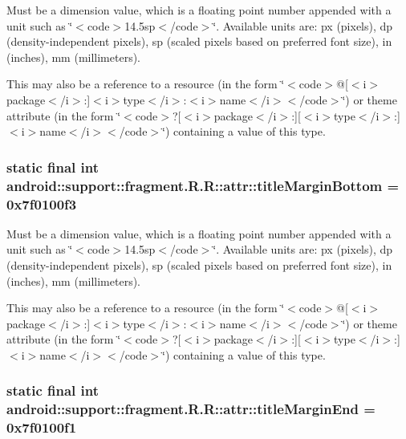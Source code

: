 Must be a dimension value, which is a floating point number appended with a unit such as \char`\"{}$<$code$>$14.5sp$<$/code$>$\char`\"{}. Available units are: px (pixels), dp (density-independent pixels), sp (scaled pixels based on preferred font size), in (inches), mm (millimeters). 

This may also be a reference to a resource (in the form \char`\"{}$<$code$>$@\mbox{[}$<$i$>$package$<$/i$>$:\mbox{]}$<$i$>$type$<$/i$>$:$<$i$>$name$<$/i$>$$<$/code$>$\char`\"{}) or theme attribute (in the form \char`\"{}$<$code$>$?\mbox{[}$<$i$>$package$<$/i$>$:\mbox{]}\mbox{[}$<$i$>$type$<$/i$>$:\mbox{]}$<$i$>$name$<$/i$>$$<$/code$>$\char`\"{}) containing a value of this type. \hypertarget{classandroid_1_1support_1_1fragment_1_1_r_1_1attr_c45d5d0d89c9c99926a853e620fb1501}{
\subsubsection[{titleMarginBottom}]{\setlength{\rightskip}{0pt plus 5cm}static final int android::support::fragment.R.R::attr::titleMarginBottom = 0x7f0100f3}}
\label{classandroid_1_1support_1_1fragment_1_1_r_1_1attr_c45d5d0d89c9c99926a853e620fb1501}


Must be a dimension value, which is a floating point number appended with a unit such as \char`\"{}$<$code$>$14.5sp$<$/code$>$\char`\"{}. Available units are: px (pixels), dp (density-independent pixels), sp (scaled pixels based on preferred font size), in (inches), mm (millimeters). 

This may also be a reference to a resource (in the form \char`\"{}$<$code$>$@\mbox{[}$<$i$>$package$<$/i$>$:\mbox{]}$<$i$>$type$<$/i$>$:$<$i$>$name$<$/i$>$$<$/code$>$\char`\"{}) or theme attribute (in the form \char`\"{}$<$code$>$?\mbox{[}$<$i$>$package$<$/i$>$:\mbox{]}\mbox{[}$<$i$>$type$<$/i$>$:\mbox{]}$<$i$>$name$<$/i$>$$<$/code$>$\char`\"{}) containing a value of this type. \hypertarget{classandroid_1_1support_1_1fragment_1_1_r_1_1attr_5fe187685d2ce26b830a1d5f0a8dcdee}{
\subsubsection[{titleMarginEnd}]{\setlength{\rightskip}{0pt plus 5cm}static final int android::support::fragment.R.R::attr::titleMarginEnd = 0x7f0100f1}}
\label{classandroid_1_1support_1_1fragment_1_1_r_1_1attr_5fe187685d2ce26b830a1d5f0a8dcdee}


